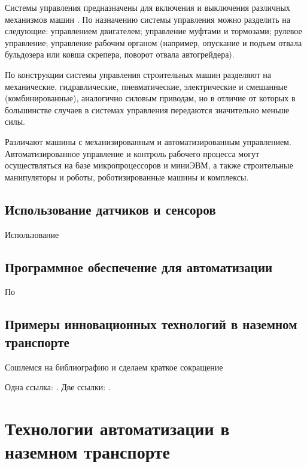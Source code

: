 Системы управления предназначены для включения и выключения различных механизмов машин \cite[с.~109]{Evtukov}.
По назначению системы управления можно разделить на следующие: управлением двигателем; управление муфтами и тормозами; рулевое управление; управление рабочим органом (например, опускание и подъем отвала бульдозера или ковша скрепера, поворот отвала автогрейдера).

По конструкции системы управления строительных машин разделяют на механические, гидравлические, пневматические, электрические и смешанные (комбинированные), аналогично силовым приводам, но в отличие от которых в большинстве случаев в системах управления передаются значительно меньше силы.

Различают машины с механизированным и автоматизированным управлением. Автоматизированное управление и контроль рабочего процесса могут осуществляться на базе микропроцессоров и миниЭВМ, а также строительные манипуляторы и роботы, роботизированные машины и комплексы.

\subsection{Использование датчиков и сенсоров}\label{subsec:ch1/sec2/sub2}

Использование

\subsection{Программное обеспечение для автоматизации}\label{subsec:ch1/sec2/sub3}

По

\subsection{Примеры инновационных технологий в наземном транспорте}\label{subsec:ch1/sec2/sub4}

Сошлемся на библиографию и сделаем краткое сокращение 

Одна ссылка: \cite[с.~39]{Evtukov}.
Две ссылки: \cite{doi:10.36652/1684-1298-2023-36-39,Baumana}.

\section{Технологии автоматизации в наземном транспорте}\label{sec:ch1/sec3}

